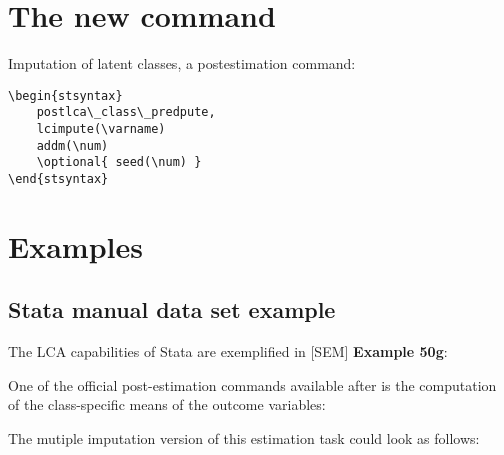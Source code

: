\section{The new command}

Imputation of latent classes, a  postestimation command:

\begin{stverbatim}
\begin{verbatim}
\begin{stsyntax}
    postlca\_class\_predpute,
    lcimpute(\varname)
    addm(\num)
    \optional{ seed(\num) }
\end{stsyntax}
\end{verbatim}
\end{stverbatim}




\section{Examples}

\subsection{Stata manual data set example}

The LCA capabilities of Stata are exemplified in [SEM] \textbf{Example 50g}:

\begin{stlog}
\nullskip
\end{stlog}

One of the official post-estimation commands available after
 is the computation of the class-specific means
of the outcome variables:

\begin{stlog}
\nullskip
\end{stlog}

The mutiple imputation version of this estimation task could
look as follows:

\begin{stlog}
\nullskip
\end{stlog}

